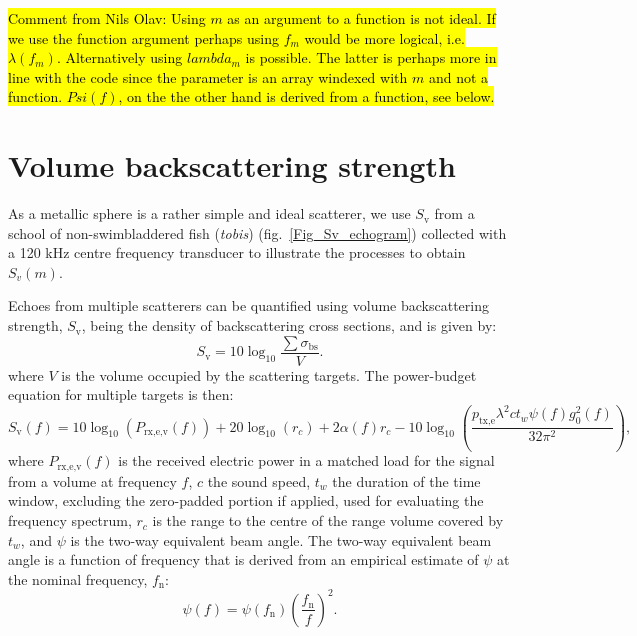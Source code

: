 \documentclass[preprint,12pt,TurnOnLineNumbers]{JASAnew}
\newcommand{\freqsym}{f}
\newcommand{\fn}{f_{\textrm{n}}}
\newcommand{\ptxe}{p_{\textrm{tx,e}}}
\newcommand{\prxevf}{P_{\textrm{rx,e,v}}}
\newcommand{\tslide}{t_w}
\newcommand{\bs}{\sigma_{\textrm{bs}}}
\newcommand{\sv}{S_{\textrm{v}}}
\newcommand{\range}{r}
\newcommand{\gainzero}{g_0}
\newcommand{\eqang}{\psi}
\newcommand{\wlen}{\lambda}
\newcommand{\cw}{c}
\newcommand{\absorp}{\alpha}
\begin{document}
\hl{Comment from Nils Olav: Using $m$ as an argument to a function is not ideal. If we use the function argument perhaps using $f_m$ would be more logical, i.e. $\lambda(f_m)$. Alternatively using $lambda_m$ is possible. The latter is perhaps more in line with the code since the parameter is an array windexed with $m$ and not a function. $Psi(f)$, on the the other hand is derived from a function, see below.}

\section{Volume backscattering strength}

As a metallic sphere is a rather simple and ideal scatterer, we use $\sv$ from a school of non-swimbladdered fish (\textit{tobis}) (fig.~\ref{Fig_Sv_echogram}) collected with a 120 kHz centre frequency transducer to illustrate the processes to obtain $S_v(m)$. 

Echoes from multiple scatterers can be quantified using volume backscattering strength, $\sv$, being the density of backscattering cross sections, and is given by:
%
\begin{equation}
\label{eq:sv}
\sv  =  10\log_{10}\frac{\sum\bs}{V}.
\end{equation}
%
where $V$ is the volume occupied by the scattering targets. The power-budget equation for multiple targets is then:
%
\begin{equation}
\label{eq:sv_f}
\sv(\freqsym) = 10\log_{10}(\prxevf(\freqsym)) + 20\log_{10}(\range_c) + 2\absorp(\freqsym)\range_c 
- 10\log_{10}\left( \frac{\ptxe \wlen^2 \cw \tslide \eqang(\freqsym) \gainzero^2(\freqsym)}{32\pi^2} \right), 
\end{equation}
%
where $\prxevf(\freqsym)$ is the received electric power in a matched load for the signal from a volume at frequency $\freqsym$, $\cw$ the sound speed, $\tslide$ the duration of the time window, excluding the zero-padded portion if applied, used for evaluating the frequency spectrum, $\range_c$ is the range to the centre of the range volume covered by $\tslide$, and $\eqang$ is the two-way equivalent beam angle. The two-way equivalent beam angle is a function of frequency that is derived from an empirical estimate of $\eqang$ at the nominal frequency, $\fn$:
\begin{equation}
\label{eq:PsiFc}
\eqang(f) = \eqang(\fn)\left(\frac{\fn}{f}\right)^2.
\end{equation}
\end{document}
